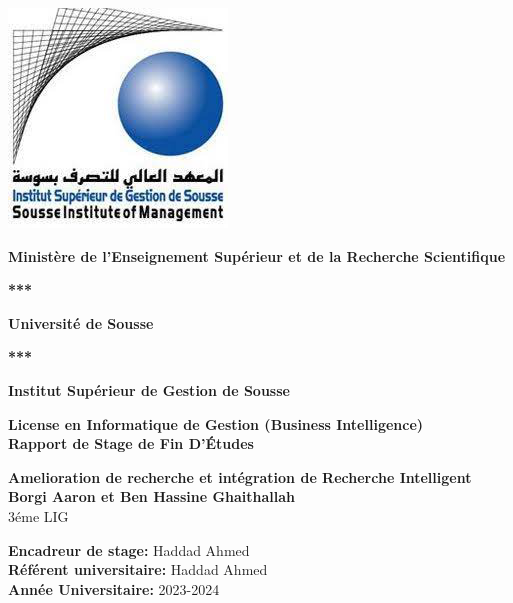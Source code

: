 \begin{titlepage}
    \begin{center}
        \includegraphics[width=.50\textwidth]{logos/isgs.png}
    
        \vspace*{0.5cm}
        \large
        \textbf{Ministère de l'Enseignement Supérieur et de la Recherche Scientifique}
        
        \vspace*{0.3cm}
        \textbf{***}

        \vspace*{0.3cm}
        \textbf{Université de Sousse}

        \vspace*{0.3cm}
        \textbf{***}

        \vspace{0.3cm}
        \textbf{Institut Supérieur de Gestion de Sousse}

        \vspace{0.3cm}
        \large
        \vspace*{0.3cm}
        \textbf{License en Informatique de Gestion (Business Intelligence)}\\

        \vspace*{0.3cm}
        \textbf{Rapport de Stage de Fin D'Études}

        \large
        \vspace*{0.3cm}
        \textbf{Amelioration de recherche et intégration de Recherche Intelligent}\\
            
        \vspace{1cm}
        \large
        \textbf{Borgi Aaron et Ben Hassine Ghaithallah}\\
        3éme LIG\\
        \vspace{0.5cm}
        
        \textbf{Encadreur de stage: } Haddad Ahmed \\        
        \textbf{Référent universitaire: } Haddad Ahmed \\
        \textbf{Année Universitaire: } 2023-2024
        
    \end{center}
\end{titlepage}
\restoregeometry
